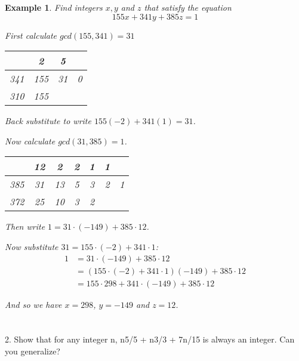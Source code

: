 \documentclass[letterpaper, 12pt, oneside]{memoir}
\theoremstyle{mystyle}
\newtheorem{example}[thm]{Example}
\begin{document}
\begin{example}
    Find integers $x, y$ and $z$ that satisfy the equation
    \[155x + 341y + 385z = 1 \]
    
    First calculate $gcd(155, 341) = 31$
    \begin{table}[H]
    \centering
    \begin{tabular}{c|c|c|c}
            & 2   & 5  &   \\ \hline
        341 & 155 & 31 & 0 \\ \hline
        310 & 155 &    & 
    \end{tabular}
    \end{table}
    
    Back substitute to write $155(-2) + 341(1)= 31$.
    
    Now calculate $gcd(31, 385) = 1$.
     \begin{table}[H]
    \centering
    \begin{tabular}{c|c|c|c|c|c|c}
            & 12  & 2   & 2  & 1  & 1  &   \\ \hline
        385 & 31  & 13  & 5  & 3  & 2  & 1 \\ \hline
        372 & 25  & 10  & 3  & 2  &    & 
    \end{tabular}
    \end{table}
    
    Then write $1 =  31 \cdot (-149) + 385 \cdot 12 $.
    
    Now substitute $31 = 155 \cdot (-2) + 341 \cdot 1$:
    \begin{align*}
        1 &= 31 \cdot (-149) + 385 \cdot 12 \\
          &= (155 \cdot (-2) + 341 \cdot 1) (-149) + 385 \cdot 12 \\
          &= 155 \cdot 298 + 341 \cdot (-149) + 385 \cdot 12
    \end{align*} 
    
    And so we have $x = 298$, $y = -149$ and $z = 12$.
    
\end{example}

\section{} 
2. Show that for any integer n, n5/5 + n3/3 + 7n/15 is always an integer. Can you generalize?
\end{document}
